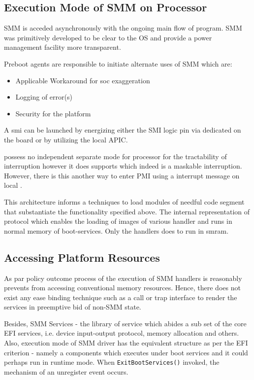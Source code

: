 \subsection{Execution Mode of SMM on Processor}\label{subsection-processor-execution-mode}
SMM is acceded asynchronously with the ongoing main flow of program. SMM was primitively developed to be clear to the OS and provide a power management facility more transparent.

Preboot agents are responsible to initiate alternate uses of SMM which are:
\begin{itemize}
	\item Applicable Workaround for \gls{soc} exaggeration
	\item Logging of error(s)
	\item Security for the platform
\end{itemize}

A \gls{smi} can be launched by energizing either the SMI logic pin via dedicated on the board or by utilizing the local APIC.

 possess no independent separate mode for processor for the tractability of interruption however it does supports  which indeed is a maskable interruption. However, there is this another way to enter PMI using a interrupt message on local .

This architecture informs a techniques to load modules of needful code segment that substantiate the functionality specified above. The internal representation of protocol which enables the loading of images of various handler and runs in normal memory of boot-services. Only the handlers does to run in \gls{smram}.

\subsection{Accessing Platform Resources}\label{subsection-access-to-platform-resources}
As par policy outcome process of the execution of SMM handlers is reasonably prevents from accessing conventional memory resources. Hence, there does not exist any ease binding technique such as a call or trap interface to render the services in preemptive bid of non-SMM state.

Besides, SMM Services - the library of service which abides a sub set of the core EFI services, i.e. device input-output protocol, memory allocation and others. Also, execution mode of SMM driver has the equivalent structure as per the EFI criterion - namely a components which executes under boot services and it could perhaps run in runtime mode. When \verb|ExitBootServices()| invoked, the mechanism of an unregister event occurs.



